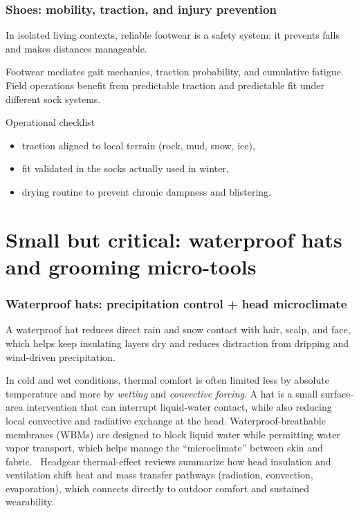 \begin{frame}[t]
  \frametitle{Shoes: mobility, traction, and injury prevention}
  \justifying
   In isolated living contexts, reliable footwear is a safety system: it prevents falls and makes distances manageable.

  \vspace{0.5em}
   Footwear mediates gait mechanics, traction probability, and cumulative fatigue. Field operations benefit from predictable traction and predictable fit under different sock systems.

  \vspace{0.8em}
  \begin{block}{Operational checklist}
    \begin{itemize}
      \item traction aligned to local terrain (rock, mud, snow, ice),
      \item fit validated in the socks actually used in winter,
      \item drying routine to prevent chronic dampness and blistering.
    \end{itemize}
  \end{block}
\end{frame}


\section{Small but critical: waterproof hats and grooming micro-tools}

\begin{frame}[t]
  \frametitle{Waterproof hats: precipitation control + head microclimate}
  \justifying
  \begin{block}
    A waterproof hat reduces direct rain and snow contact with hair, scalp, and face, which helps keep insulating layers dry and reduces distraction from dripping and wind-driven precipitation.
  \end{block}

  \begin{block}
    In cold and wet conditions, thermal comfort is often limited less by absolute temperature and more by \emph{wetting} and \emph{convective forcing}. A hat is a small surface-area intervention that can interrupt liquid-water contact, while also reducing local convective and radiative exchange at the head. Waterproof-breathable membranes (WBMs) are designed to block liquid water while permitting water vapor transport, which helps manage the ``microclimate'' between skin and fabric.~\cite{wbm_review_2023}
    Headgear thermal-effect reviews summarize how head insulation and ventilation shift heat and mass transfer pathways (radiation, convection, evaporation), which connects directly to outdoor comfort and sustained wearability.~\cite{bogerd_headgear_2015}
  \end{block}
\end{frame}


